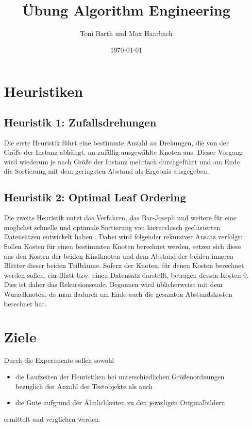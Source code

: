 \documentclass[a4paper, 10pt, twoside, onecolumn, parskip]{scrartcl}
\title{Übung Algorithm Engineering} %
\author{{Toni Barth} und {Max Haarbach}} %
\date{\today}            %
\begin{document}
    \maketitle                %

    \section{Heuristiken} \label{sec:heuristiken}

    \subsection{Heuristik 1: Zufallsdrehungen}

    Die erste Heuristik führt eine bestimmte Anzahl an Drehungen, die von der Größe der Instanz abhängt, an zufällig ausgewählte Knoten aus.
    Dieser Vorgang wird wiederum je nach Größe der Instanz mehrfach durchgeführt und am Ende die Sortierung mit dem geringsten Abstand als Ergebnis ausgegeben.

    \subsection{Heuristik 2: Optimal Leaf Ordering}

    Die zweite Heuristik nutzt das Verfahren, das Bar-Joseph und weitere für eine möglichst schnelle und optimale Sortierung von hierarchisch geclusterten Datensätzen entwickelt haben \cite{bar2001fast}.
    Dabei wird folgender rekursiver Ansatz verfolgt:
    Sollen Kosten für einen bestimmten Knoten berechnet werden, setzen sich diese aus den Kosten der beiden Kindknoten und dem Abstand der beiden inneren Blätter dieser beiden Teilbäume.
    Sofern der Knoten, für denen Kosten berechnet werden sollen, ein Blatt bzw. einen Datensatz darstellt, betragen dessen Kosten $0$.
    Dies ist daher das Rekursionsende.
    Begonnen wird üblicherweise mit dem Wurzelknoten, da man dadurch am Ende auch die gesamten Abstandskosten berechnet hat.

    \section{Ziele} \label{sec:ziele}

    Durch die Experimente sollen sowohl
    \begin{itemize}
        \item die Laufzeiten der Heuristiken bei unterschiedlichen Größenordnungen bezüglich der Anzahl der Testobjekte als auch
        \item die Güte aufgrund der Ähnlichkeiten zu den jeweiligen Originalbildern
    \end{itemize}
    ermittelt und verglichen werden.
\end{document}
